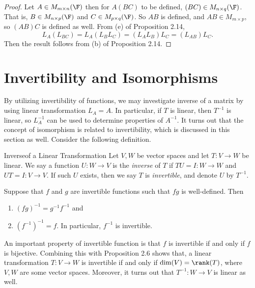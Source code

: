 \documentclass[linearalgebraI]{subfiles}
\begin{document}
    \begin{proof}
        Let $A\in M_{m\times n}(\F)$ then for $A(BC)$ to be defined, $(BC)\in M_{n\times q}(\F)$. That is, $B\in M_{n\times p}(\F)$ and $C\in M_{p\times q}(\F)$. So $AB$ is defined, and $AB\in M_{m\times p}$, so $(AB)C$ is defined as well. From (e) of Proposition 2.14,
        \begin{equation*}
            L_A(L_{BC}) = L_A(L_BL_C) = (L_AL_B)L_C = (L_{AB})L_C.
        \end{equation*}
        Then the result follows from (b) of Proposition 2.14.
    \end{proof}

    \section{Invertibility and Isomorphisms}

    \begin{remark}
        By utilizing invertibility of functions, we may investigate inverse of a matrix by using linear transformation $L_A = A$. In particular, if $T$ is linear, then $T^{-1}$ is linear, so $L_A^{-1}$ can be used to determine properties of $A^{-1}$. It turns out that the concept of isomorphism is related to invertibility, which is discussed in this section as well. Consider the following definition.
    \end{remark}

    \begin{definition}{Inverse}{of a Linear Transformation}
        Let $V, W$ be vector spaces and let $T:V\to W$ be linear. We say a function $U:W\to V$ is the \emph{inverse} of $T$ if $TU=I:W\to W$ and $UT=I:V\to V$. If such $U$ exists, then we say $T$ is \emph{invertible}, and denote $U$ by $T^{-1} $.
    \end{definition}

    \begin{remark}
        Suppose that $f$ and $g$ are invertible functions such that $fg$ is well-defined. Then
        \begin{enumerate}
            \item $\left( fg \right) ^{-1} = g^{-1} f^{-1} $ and
            \item $\left( f^{-1}  \right) ^{-1} = f$. In particular, $f^{-1} $ is invertible.
        \end{enumerate}
        An important property of invertible function is that $f$ is invertible if and only if $f$ is bijective. Combining this with Proposition 2.6 shows that, a linear transformation $T:V\to W$ is invertible if and only if $\dim(V)=\rank(T)$, where $V, W$ are some vector spaces. Moreover, it turns out that $T^{-1}:W\to V$ is linear as well.
    \end{remark}
\end{document}
